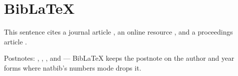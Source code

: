 \documentclass[acmsmall,nonacm,natbib=false]{acmart}
\begin{document}
\thispagestyle{empty}

\section{BibLaTeX}
This sentence cites a journal article \cite{Abril07}, an online resource
\cite{Ablamowicz07}, and a proceedings article \cite{Andler79}.

Postnotes: \cite[p.~5]{Abril07}, \textcite[p.~5]{Abril07}, \citeauthor[p.~5]{Abril07}, and \citeyear[p.~5]{Abril07} --- BibLaTeX keeps the postnote on the author and year forms where natbib's numbers mode drops it.

\printbibliography
\end{document}
